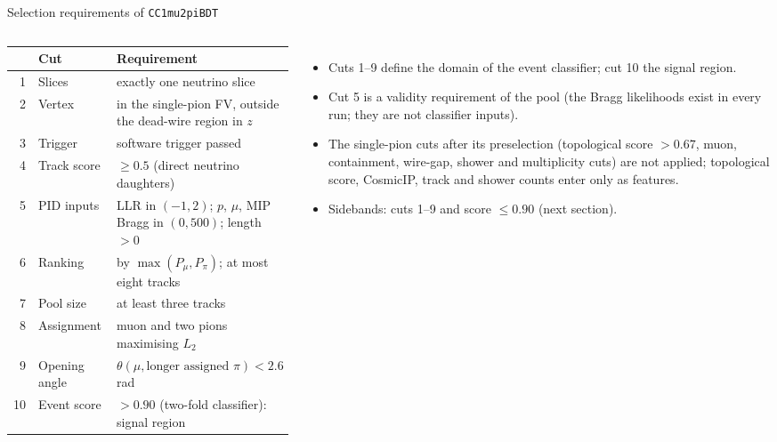 \documentclass[aspectratio=169,10pt]{beamer}
\begin{document}
\begin{frame}{Selection requirements of \texttt{CC1mu2piBDT}}
  \footnotesize
  \begin{columns}[T]
  \setlength{\tabcolsep}{3pt}
  \begin{tabular}{rlp{}}
    \toprule
    & Cut & Requirement \\
    \midrule
    1 & Slices & exactly one neutrino slice \\
    2 & Vertex & in the single-pion FV, outside the dead-wire region in $z$ \\
    3 & Trigger & software trigger passed \\
    4 & Track score & $\geq0.5$ (direct neutrino daughters) \\
    5 & PID inputs & LLR in $(-1,2)$; $p$, $\mu$, MIP Bragg in $(0,500)$; length $>0$ \\
    6 & Ranking & by $\max(P_\mu,P_\pi)$; at most eight tracks \\
    7 & Pool size & at least three tracks \\
    8 & Assignment & muon and two pions maximising $L_2$ \\
    9 & Opening angle & $\theta(\mu,\text{longer assigned }\pi)<2.6$ rad \\
    10 & Event score & $>0.90$ (two-fold classifier): signal region \\
    \bottomrule
  \end{tabular}
  \begin{itemize}\footnotesize\setlength\itemsep{3pt}
    \item Cuts 1--9 define the domain of the event classifier; cut 10 the signal region.
    \item Cut 5 is a validity requirement of the pool (the Bragg likelihoods exist in every run; they are
          not classifier inputs).
    \item The single-pion cuts after its preselection (topological score $>0.67$, muon, containment,
          wire-gap, shower and multiplicity cuts) are not applied; topological score, CosmicIP, track and
          shower counts enter only as features.
    \item Sidebands: cuts 1--9 and score $\leq0.90$ (next section).
  \end{itemize}
  \end{columns}
\end{frame}
\end{document}
